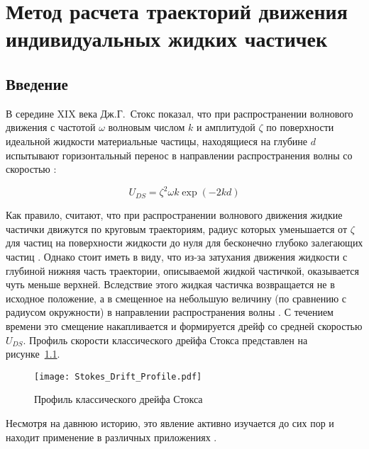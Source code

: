 \chapter{Метод расчета траекторий движения индивидуальных жидких частичек} \label{ch:ch2}

\section{Введение} \label{sec:ch2/sec1}

В середине XIX века Дж.Г.~Стокс показал, что при распространении волнового движения с частотой $ \omega $ волновым числом $ k $ и амплитудой $ \zeta $ по поверхности идеальной жидкости материальные частицы, находящиеся на глубине $ d $ испытывают горизонтальный перенос в направлении распространения волны со скоростью \parencite{Stokes}:

\begin{equation}
U_{DS}=\zeta^{2} \omega k \exp \left(-2kd\right)
\label{DriftStokes}
\end{equation}

Как правило, считают, что при распространении волнового движения жидкие частички движутся по круговым траекториям, радиус которых уменьшается от $ \zeta $ для частиц на поверхности жидкости до нуля для бесконечно глубоко залегающих частиц \parencite{Landau, Levich, Sivukhin}. Однако стоит иметь в виду, что из-за затухания движения жидкости с глубиной нижняя часть траектории, описываемой жидкой частичкой, оказывается чуть меньше верхней. Вследствие этого жидкая частичка возвращается не в исходное положение, а в смещенное на небольшую величину (по сравнению с радиусом окружности) в направлении распространения волны \parencite{clamond2007lagrangian}. С течением времени это смещение накапливается и формируется дрейф со средней скоростью $ U_{DS} $. Профиль скорости классического дрейфа Стокса представлен на рисунке~\ref{fig:Drift_Profile}. 

\begin{figure}
\centering
\texttt{[image: Stokes\_Drift\_Profile.pdf]}
\caption{Профиль классического дрейфа Стокса}\label{fig:Drift_Profile}
\end{figure}

Несмотря на давнюю историю, это явление активно изучается до сих пор и находит применение в различных приложениях \parencite{herreman2011stokes, feng2010ocean, christensen2009drift, rohrs2014wave, isobe2014selective}. 

